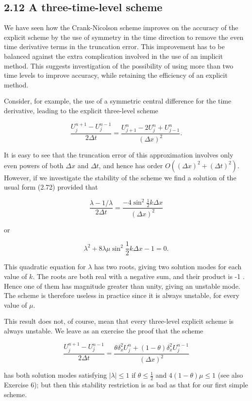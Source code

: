 \documentclass[10pt]{article}
\begin{document}
\subsection*{2.12 A three-time-level scheme}
We have seen how the Crank-Nicolson scheme improves on the accuracy of the explicit scheme by the use of symmetry in the time direction to remove the even time derivative terms in the truncation error. This improvement has to be balanced against the extra complication involved in the use of an implicit method. This suggests investigation of the possibility of using more than two time levels to improve accuracy, while retaining the efficiency of an explicit method.

Consider, for example, the use of a symmetric central difference for the time derivative, leading to the explicit three-level scheme

\[
\frac{U_{j}^{n+1}-U_{j}^{n-1}}{2 \Delta t}=\frac{U_{j+1}^{n}-2 U_{j}^{n}+U_{j-1}^{n}}{(\Delta x)^{2}} .
\]

It is easy to see that the truncation error of this approximation involves only even powers of both \(\Delta x\) and \(\Delta t\), and hence has order \(O\left((\Delta x)^{2}+\right. \left.(\Delta t)^{2}\right)\). However, if we investigate the stability of the scheme we find a solution of the usual form (2.72) provided that

\[
\frac{\lambda-1 / \lambda}{2 \Delta t}=\frac{-4 \sin ^{2} \frac{1}{2} k \Delta x}{(\Delta x)^{2}}
\]

or

\[
\lambda^{2}+8 \lambda \mu \sin ^{2} \frac{1}{2} k \Delta x-1=0 .
\]

This quadratic equation for \(\lambda\) has two roots, giving two solution modes for each value of \(k\). The roots are both real with a negative sum, and their product is -1 . Hence one of them has magnitude greater than unity, giving an unstable mode. The scheme is therefore useless in practice since it is always unstable, for every value of \(\mu\).

This result does not, of course, mean that every three-level explicit scheme is always unstable. We leave as an exercise the proof that the scheme

\[
\frac{U_{j}^{n+1}-U_{j}^{n-1}}{2 \Delta t}=\frac{\theta \delta_{x}^{2} U_{j}^{n}+(1-\theta) \delta_{x}^{2} U_{j}^{n-1}}{(\Delta x)^{2}}
\]

has both solution modes satisfying \(|\lambda| \leq 1\) if \(\theta \leq \frac{1}{2}\) and \(4(1-\theta) \mu \leq 1\) (see also Exercise 6); but then this stability restriction is as bad as that for our first simple scheme.
\end{document}
